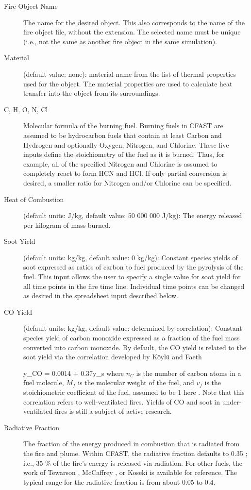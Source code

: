 \begin{description}
\item[Fire Object Name] The name for the desired object.  This also corresponds to the name of the fire object file, without the extension. The selected name must be unique (i.e., not the same as another fire object in the same simulation).

\item[Material] (default value: none): material name from the list of thermal properties used for the object. The material properties are used to calculate heat transfer into the object from its surroundings.

\item[C, H, O, N, Cl] Molecular formula of the burning fuel. Burning fuels in CFAST are assumed to be hydrocarbon fuels that contain at least Carbon and Hydrogen and optionally Oxygen, Nitrogen, and Chlorine. These five inputs define the stoichiometry of the fuel as it is burned.  Thus, for example, all of the specified Nitrogen and Chlorine is assumed to completely react to form HCN and HCl.  If only partial conversion is desired, a smaller ratio for Nitrogen and/or Chlorine can be specified.

\item[Heat of Combustion] (default units: J/kg, default value: 50 000 000 J/kg): The energy released per kilogram of mass burned.

\item[Soot Yield] (default units: kg/kg, default value: 0 kg/kg): Constant species yields of soot expressed as ratios of carbon to fuel produced by the pyrolysis of the fuel. This input allows the user to specify a single value for soot yield for all time points in the fire time line. Individual time points can be changed as desired in the spreadsheet input described below.

\item[CO Yield] (default units: kg/kg, default value: determined by correlation): Constant species yield of carbon monoxide expressed as a fraction of the fuel mass converted into carbon monoxide.  By default, the CO yield is related to the soot yield via the correlation developed by K\"oyl\"u and Faeth

\be
y_{CO} = 0.0014 + 0.37y_s \label{eq:Koylu}
\ee
where $n_C$ is the number of carbon atoms in a fuel molecule, $M_f$ is the molecular weight of the fuel, and $v_f$ is the stoichiometric coefficient of the fuel, assumed to be 1 here \cite{Koylu:1991}. Note that this correlation refers to well-ventilated fires. Yields of CO and soot in under-ventilated fires is still a subject of active research.

\item[Radiative Fraction] The fraction of the energy produced in combustion that is radiated from the fire and plume. Within CFAST, the radiative fraction defaults to 0.35 ; i.e., 35 \% of the fire’s energy is released via radiation.  For other fuels, the work of Tewarson \cite{Tewarson:2003}, McCaffrey \cite{McCaffrey:1982}, or Koseki \cite{Koseki:1989} is available for reference.  The typical range for the radiative fraction is from about 0.05 to 0.4.
\end{description}

